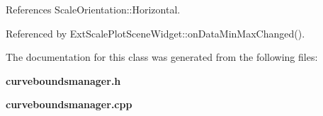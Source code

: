 References Scale\+Orientation\+::\+Horizontal.



Referenced by Ext\+Scale\+Plot\+Scene\+Widget\+::on\+Data\+Min\+Max\+Changed().



The documentation for this class was generated from the following files\+:\begin{DoxyCompactItemize}
\item 
{\bf curveboundsmanager.\+h}\item 
{\bf curveboundsmanager.\+cpp}\end{DoxyCompactItemize}
